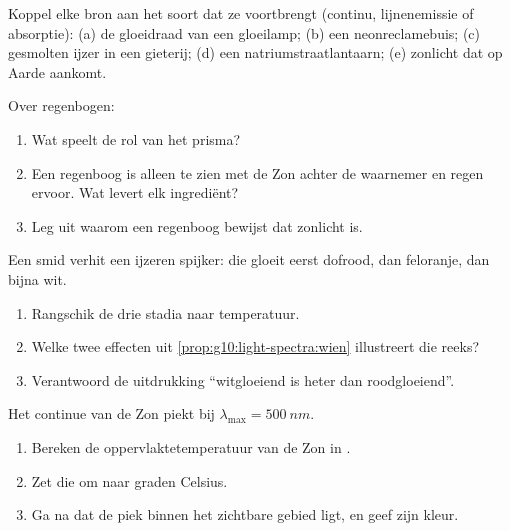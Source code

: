 \begin{exercise}[$\star$]\label{exo:g10:light-spectra:3}
Koppel elke bron aan het soort  dat ze voortbrengt (continu,
lijnenemissie of absorptie): (a) de gloeidraad van een gloeilamp; (b) een
neonreclamebuis; (c) gesmolten ijzer in een gieterij; (d) een
natriumstraatlantaarn; (e) zonlicht dat op Aarde aankomt.
\end{exercise}

\begin{exercise}[$\star$]\label{exo:g10:light-spectra:4}
Over regenbogen:
\begin{enumerate}
  \item Wat speelt de rol van het prisma?
  \item Een regenboog is alleen te zien met de Zon achter de waarnemer en
        regen ervoor. Wat levert elk ingrediënt?
  \item Leg uit waarom een regenboog bewijst dat zonlicht  is.
\end{enumerate}
\end{exercise}

\begin{exercise}[$\star$]\label{exo:g10:light-spectra:5}
Een smid verhit een ijzeren spijker: die gloeit eerst dofrood, dan
feloranje, dan bijna wit.
\begin{enumerate}
  \item Rangschik de drie stadia naar temperatuur.
  \item Welke twee effecten uit \cref{prop:g10:light-spectra:wien}
        illustreert die reeks?
  \item Verantwoord de uitdrukking ``witgloeiend is heter dan
        roodgloeiend''.
\end{enumerate}
\end{exercise}

\begin{exercise}[$\star\star$]\label{exo:g10:light-spectra:6}
Het continue  van de Zon piekt bij
$\lambda_{\max} = \qty{500}{nm}$.
\begin{enumerate}
  \item Bereken de oppervlaktetemperatuur van de Zon in .
  \item Zet die om naar graden Celsius.
  \item Ga na dat de piek binnen het zichtbare gebied ligt, en geef zijn
        kleur.
\end{enumerate}
\end{exercise}

